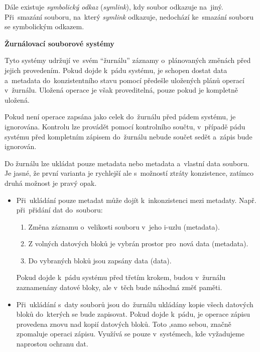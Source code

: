 \vspace{0,5cm}

Dále existuje \emph{symbolický odkaz} (\emph{symlink}), kdy soubor odkazuje na~jiný. Při~smazání souboru, na~který \emph{symlink} odkazuje, nedochází ke~smazání souboru se symbolickým odkazem. 

\clearpage

\begin{Large}
	\textbf{Žurnálovací souborové systémy}
\end{Large}

Tyto systémy udržují ve~svém \enquote{žurnálu} záznamy o~plánovaných změnách před jejich provedením. Pokud dojde k~pádu systému, je schopen dostat data a~metadata do~konzistentního stavu pomocí předešle uložených plánů operací v~žurnálu. 
Uložená operace je však proveditelná, pouze pokud je kompletně uložená. 

\vspace{0,5cm}

Pokud není operace zapsána jako celek do~žurnálu před pádem systému, je ignorována. Kontrolu lze provádět pomocí kontrolního součtu, v~případě pádu systému před kompletním zápisem do~žurnálu nebude součet sedět a~zápis bude ignorován.

\vspace{0,5cm}

Do žurnálu lze ukládat pouze metadata nebo metadata a~vlastní data souboru. Je jasné, že první varianta je rychlejší ale s~možností ztráty konzistence, zatímco druhá možnost je pravý opak.

\begin{itemize}
	\item Při~ukládání pouze metadat může dojít k~inkonzistenci mezi metadaty. Např. při~přidání dat do~souboru:
	\begin{enumerate}
		\item Změna záznamu o~velikosti souboru v~jeho i-uzlu (metadata).
		\item Z volných datových bloků je vybrán prostor pro~nová data (metadata).
		\item Do vybraných bloků jsou zapsány data (data). 
	\end{enumerate}
	Pokud dojde k~pádu systému před třetím krokem, budou v~žurnálu zaznamenány datové bloky, ale v~těch bude náhodná změť paměti. 
	
	\item Při~ukládání s~daty souborů jsou do~žurnálu ukládány kopie všech datových bloků do~kterých se bude zapisovat. Pokud dojde k~pádu, je operace zápisu provedena znovu nad kopií datových bloků. Toto ,samo sebou, značně zpomaluje operaci zápisu. Využívá se pouze v~systémech, kde vyžadujeme naprostou ochranu dat. 
\end{itemize}

